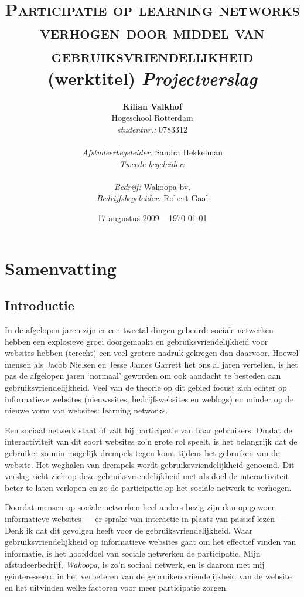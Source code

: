 \documentclass[a4paper, 10pt, pdftex]{report}
\title{\textsc{Participatie op learning networks verhogen door middel van gebruiksvriendelijkheid} \linebreak (werktitel) \linebreak \emph{Projectverslag}}
\author{\textbf{Kilian Valkhof}\\
  Hogeschool Rotterdam\\
  \textit{studentnr.:} 0783312\\
  \\
  \textit{Afstudeerbegeleider:} Sandra Hekkelman\\
  \textit{Tweede begeleider:}\\
  \\
  \textit{Bedrijf:} Wakoopa bv.\\
  \textit{Bedrijfsbegeleider:} Robert Gaal}
\date{17 augustus 2009 -- \today}
\begin{document}
  \normalem
  \maketitle

  \newpage
  \chapter*{Samenvatting}

  \newpage
  \tableofcontents

  \newpage
  \section*{Introductie}
    In de afgelopen jaren zijn er een tweetal dingen gebeurd: sociale netwerken hebben een explosieve groei doorgemaakt
  en gebruiksvriendelijkheid voor websites hebben (terecht) een veel grotere nadruk gekregen dan daarvoor. Hoewel mensen
  als Jacob Nielsen en Jesse James Garrett het ons al jaren vertellen, is het pas de afgelopen jaren `normaal' geworden
  om ook aandacht te besteden aan gebruiksvriendelijkheid. Veel van de theorie op dit gebied focust zich echter op
  informatieve websites (nieuwssites, bedrijfswebsites en weblogs) en minder op de nieuwe vorm van websites: learning networks.

    Een sociaal netwerk staat of valt bij participatie van haar gebruikers. Omdat de interactiviteit van dit soort websites zo'n grote rol speelt, is het belangrijk dat de gebruiker zo min mogelijk drempels tegen komt tijdens het gebruiken van de website. Het weghalen van drempels wordt gebruiksvriendelijkheid genoemd. Dit verslag richt zich op deze gebruiksvriendelijkheid met als doel de interactiviteit beter te laten verlopen en zo de participatie op het sociale netwerk te verhogen.

  Doordat mensen op sociale netwerken heel anders bezig zijn dan op gewone informatieve websites --- er sprake van interactie in plaats van passief lezen --- Denk ik dat dit gevolgen heeft voor de gebruiksvriendelijkheid. Waar gebruiksvriendelijkheid op informatieve websites gaat om het effectief vinden van informatie, is het hoofddoel van sociale netwerken de participatie. Mijn afstudeerbedrijf, \emph{Wakoopa}, is zo'n sociaal netwerk, en is daarom met mij geinteresseerd in het verbeteren van de gebruikersvriendelijkheid van de website en het uitvinden welke factoren voor meer participatie zorgen.
\end{document}
